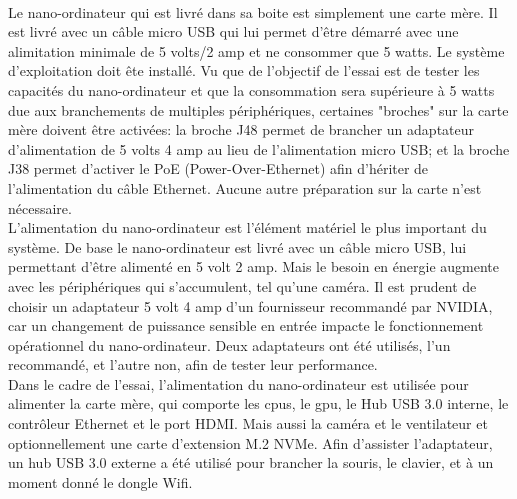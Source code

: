 \vspace{0.5\baselineskip}
\\
\noindent Le nano-ordinateur qui est livré dans sa boite est simplement une carte mère. Il est livré avec un câble micro USB qui lui permet d'être démarré avec une alimitation minimale de 5 volts/2 amp et ne consommer que 5 watts. Le système d'exploitation doit ête installé. Vu que de l'objectif de l'essai est de tester les capacités du nano-ordinateur et que la consommation sera supérieure à 5 watts due aux branchements de multiples périphériques, certaines "broches" sur la carte mère doivent être activées: la broche J48 permet de brancher un adaptateur d'alimentation de 5 volts 4 amp au lieu de l'alimentation micro USB; et la broche J38 permet d'activer le PoE (Power-Over-Ethernet) afin d'hériter de l'alimentation du câble Ethernet. Aucune autre préparation sur la carte n'est nécessaire.
{
\vspace{0.5\baselineskip}
\\
\noindent L'alimentation du nano-ordinateur est l'élément matériel le plus important du système. De base le nano-ordinateur est livré avec un câble micro USB, lui permettant d'être alimenté en 5 volt 2 amp. Mais le besoin en énergie augmente avec les périphériques qui s'accumulent, tel qu'une caméra. Il est prudent de choisir un adaptateur 5 volt 4 amp d'un fournisseur recommandé par NVIDIA, car un changement de puissance sensible en entrée impacte le fonctionnement opérationnel du nano-ordinateur. Deux adaptateurs ont été utilisés, l'un recommandé, et l'autre non, afin de tester leur performance. 
\vspace{0.5\baselineskip}
\\
\noindent Dans le cadre de l'essai, l'alimentation du nano-ordinateur est utilisée pour alimenter la carte mère, qui comporte les \acrshort{cpu}s, le \acrshort{gpu}, le Hub USB 3.0 interne, le contrôleur Ethernet et le port HDMI. Mais aussi la caméra et le ventilateur et optionnellement une carte d'extension M.2 NVMe. Afin d'assister l'adaptateur, un hub USB 3.0 externe a été utilisé pour brancher la souris, le clavier, et à un moment donné le dongle Wifi.
}
